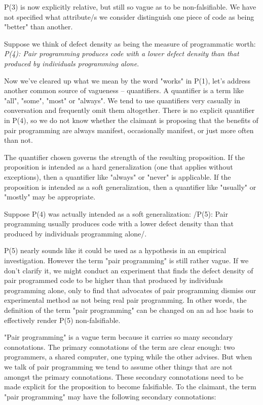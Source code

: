 \documentclass{article}
\begin{document}
\begin{enumerate}
P(3) is now explicitly relative, but still so vague as to be
non-falsifiable. We have not specified what attribute/s we consider
distinguish one piece of code as being "better" than another.

Suppose we think of defect density as being the measure of programmatic
worth: \emph{P(4): Pair programming produces code with a lower defect density
than that produced by individuals programming alone}.

Now we've cleared up what we mean by the word "works" in P(1), let's
address another common source of vagueness -- quantifiers. A quantifier
is a term like "all", "some", "most" or "always". We tend to use
quantifiers very casually in conversation and frequently omit them
altogether. There is no explicit quantifier in P(4), so we do not know
whether the claimant is proposing that the benefits of pair programming
are always manifest, occasionally manifest, or just more often than not.

The quantifier chosen governs the strength of the resulting proposition.
If the proposition is intended as a hard generalization (one that
applies without exceptions), then a quantifier like "always" or "never"
is applicable. If the proposition is intended as a soft generalization,
then a quantifier like "usually" or "mostly" may be appropriate.

Suppose P(4) was actually intended as a soft generalization: /P(5): Pair
programming usually produces code with a lower defect density than that
produced by individuals programming alone/.

P(5) nearly sounds like it could be used as a hypothesis in an empirical
investigation. However the term "pair programming" is still rather
vague. If we don't clarify it, we might conduct an experiment that finds
the defect density of pair programmed code to be higher than that
produced by individuals programming alone, only to find that advocates
of pair programming dismiss our experimental method as not being real
pair programming. In other words, the definition of the term "pair
programming" can be changed on an ad hoc basis to effectively render
P(5) non-falsifiable.

"Pair programming" is a vague term because it carries so many secondary
connotations. The primary connotations of the term are clear enough: two
programmers, a shared computer, one typing while the other advises. But
when we talk of pair programming we tend to assume other things that are
not amongst the primary connotations. These secondary connotations need
to be made explicit for the proposition to become falsifiable. To the
claimant, the term "pair programming" may have the following secondary
connotations:


\end{enumerate}
\end{document}
